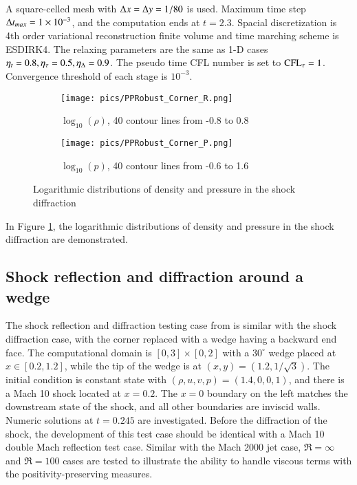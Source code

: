 \documentclass[preprint,12pt]{elsarticle}
\begin{document}
A square-celled mesh with $\mathrm\Delta x = \mathrm\Delta y = 1/80$ is used. 
Maximum time step $\mathrm\Delta t_{max}=1\times 10^{-3}$, and the computation ends at 
$t=2.3$. 
Spacial discretization is 4th order variational reconstruction finite volume
and time marching scheme is ESDIRK4. 
The relaxing parameters are the same as 
1-D cases $\eta_t= 0.8, \eta_\tau=0.5, \eta_\mathrm\Delta=0.9$.
The pseudo time CFL number is set to $\text{CFL}_\tau = 1$. 
Convergence threshold of each stage is $10^{-3}$. 

\begin{figure}[htbp]
    \centering
    \begin{subfigure}{0.5\textwidth}
        \texttt{[image: pics/PPRobust\_Corner\_R.png]}
        \caption[]{$\log_{10}(\rho)$, 40 contour lines from -0.8 to 0.8}
    \end{subfigure}\hfill
    \begin{subfigure}{0.5\textwidth}
        \texttt{[image: pics/PPRobust\_Corner\_P.png]}
        \caption[]{$\log_{10}(p)$, 40 contour lines from -0.6 to 1.6}
    \end{subfigure}
    \caption{Logarithmic distributions of density and pressure in the shock diffraction}
    \label{fig:Corner}
\end{figure}

In Figure \ref{fig:Corner}, 
the logarithmic distributions of density and pressure in the shock diffraction
are demonstrated. 


\subsection{Shock reflection and diffraction around a wedge}

The shock reflection and diffraction testing case from \cite{zhang2017positivity}
is similar with the shock diffraction case, with the 
corner replaced with a wedge having a backward end face.
The computational domain is $[0,3]\times[0,2]$ with 
a $30^\circ$ wedge placed at $x\in[0.2,1.2]$, while the 
tip of the wedge is at $(x,y) = (1.2, 1/\sqrt{3})$. 
The initial condition is constant state with $(\rho, u, v, p) = (1.4,0,0,1)$, 
and there is a Mach 10 shock located at $x = 0.2$. The $x=0$ boundary on 
the left matches the downstream state of the shock, and all other boundaries 
are inviscid walls. Numeric solutions at $t=0.245$ are investigated. 
Before the diffraction of the shock, the development
of this test case should be identical with a Mach 10 double Mach reflection \cite{woodward1984dmr}
test case. Similar with the Mach 2000 jet case, $\Re=\infty$ and $\Re=100$ cases 
are tested to illustrate the ability to handle viscous terms 
with the positivity-preserving measures.
\end{document}
